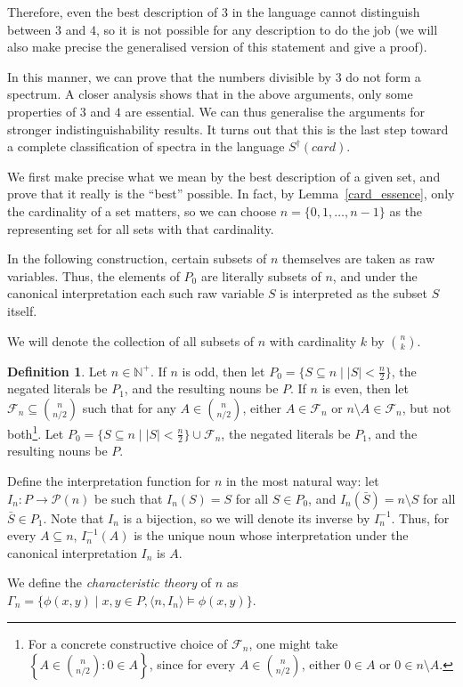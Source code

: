 \documentclass[12pt, reqno]{amsart}
\theoremstyle{definition}
\newtheorem{definition}[theorem]{Definition}
\theoremstyle{remark}
\numberwithin{equation}{section}
\begin{document}
Therefore, even the best description of $3$ in the language cannot distinguish between $3$ and $4$, so it is not possible for any description to do the job (we will also make precise the generalised version of this statement and give a proof).

In this manner, we can prove that the numbers divisible by $3$ do not form a spectrum. A closer analysis shows that in the above arguments, only some properties of $3$ and $4$ are essential. We can thus generalise the arguments for stronger indistinguishability results. It turns out that this is the last step toward a complete classification of spectra in the language $S^{\dagger}(card)$. 


We first make precise what we mean by the best description of a given set, and prove that it really is the ``best'' possible. In fact, by Lemma~\ref{card_essence}, only the cardinality of a set matters, so we can choose $n = \{0, 1, \dots, n-1\}$ as the representing set for all sets with that cardinality.

In the following construction, certain subsets of $n$ themselves are taken as raw variables. Thus, the elements of $P_0$ are literally subsets of $n$, and under the canonical interpretation each such raw variable $S$ is interpreted as the subset $S$ itself.

We will denote the collection of all subsets of $n$ with cardinality $k$ by $\binom{n}{k}$.

\begin{definition}\label{char_theory}
Let $n \in \mathbb{N}^+$. If $n$ is odd, then let $P_{0} = \{S \subseteq n \mid |S| < \frac{n}{2}\}$, the negated literals be $P_1$, and the resulting nouns be $P$.  If $n$ is even, then let $\mathcal F_n \subseteq \binom{n}{n/2}$ such that for any $A \in \binom{n}{n/2}$, either $A \in \mathcal F_n$ or $n \setminus A \in \mathcal F_n$, but not both\footnote{For a concrete constructive choice of $\mathcal F_n$, one might take $\left\{
A\in\binom{n}{n/2}:0\in A
\right\}$, since for every $A \in \binom{n}{n/2}$, either $0 \in A$ or $0 \in n \setminus A$.}. Let $P_{0} = \{S \subseteq n \mid |S| < \frac{n}{2}\} \cup \mathcal F_n$, the negated literals be $P_1$, and the resulting nouns be $P$.

Define the interpretation function for $n$ in the most natural way: let $I_n: P \to \mathcal{P}(n)$ be such that $I_n(S) = S$ for all $S \in P_0$, and $I_n(\bar{S}) = n \setminus S$ for all $\bar{S} \in P_1$. Note that $I_n$ is a bijection, so we will denote its inverse by $I_n^{-1}$. Thus, for every $A\subseteq n$, $I_n^{-1}(A)$ is the unique noun whose
interpretation under the canonical interpretation $I_n$ is $A$.

We define the \textit{characteristic theory} of $n$ as $\Gamma_n = \{\phi(x, y) \mid x, y \in P,  \langle n, I_n \rangle \models \phi(x, y)\}$. 
\end{definition}
\end{document}
